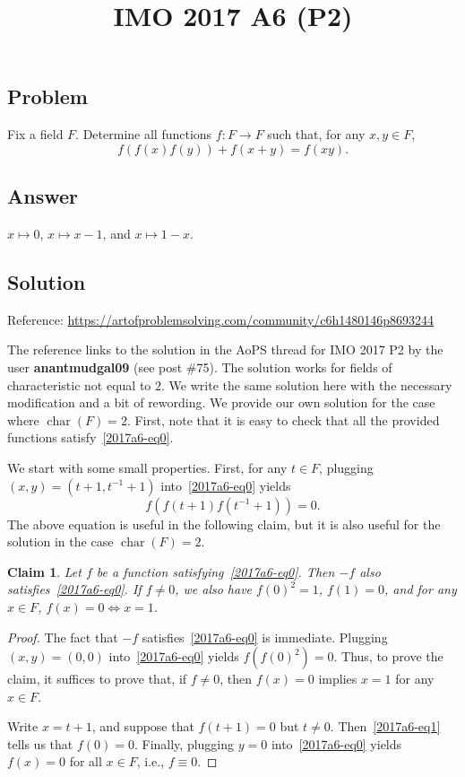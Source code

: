 \documentclass{article}
\title{IMO 2017 A6 (P2)}
\author{}
\date{}
\DeclareMathOperator{\rchar}{char}
\newtheorem*{claim}{Claim}
\begin{document}
\maketitle



\subsection*{Problem}

Fix a field $F$.
Determine all functions $f : F \to F$ such that, for any $x, y \in F$,
\[ f(f(x) f(y)) + f(x + y) = f(xy). \tag{*}\label{2017a6-eq0} \]



\subsection*{Answer}

$x \mapsto 0$, $x \mapsto x - 1$, and $x \mapsto 1 - x$.



\subsection*{Solution}

Reference: \url{https://artofproblemsolving.com/community/c6h1480146p8693244}

The reference links to the solution in the AoPS thread for IMO 2017 P2 by the user \textbf{anantmudgal09} (see post \#75).
The solution works for fields of characteristic not equal to $2$.
We write the same solution here with the necessary modification and a bit of rewording.
We provide our own solution for the case where $\rchar(F) = 2$.
First, note that it is easy to check that all the provided functions satisfy~\eqref{2017a6-eq0}.

We start with some small properties.
First, for any $t \in F$, plugging $(x, y) = (t + 1, t^{-1} + 1)$ into~\eqref{2017a6-eq0} yields
\[ f(f(t + 1) f(t^{-1} + 1)) = 0. \tag{1}\label{2017a6-eq1} \]
The above equation is useful in the following claim, but it is also useful for the solution in the case $\rchar(F) = 2$.

\begin{claim}
Let $f$ be a function satisfying~\eqref{2017a6-eq0}.
Then $-f$ also satisfies~\eqref{2017a6-eq0}.
If $f \neq 0$, we also have $f(0)^2 = 1$, $f(1) = 0$, and for any $x \in F$, $f(x) = 0 \iff x = 1$.
\end{claim}
\begin{proof}
The fact that $-f$ satisfies~\eqref{2017a6-eq0} is immediate.
Plugging $(x, y) = (0, 0)$ into~\eqref{2017a6-eq0} yields $f(f(0)^2) = 0$.
Thus, to prove the claim, it suffices to prove that, if $f \neq 0$, then $f(x) = 0$ implies $x = 1$ for any $x \in F$.

Write $x = t + 1$, and suppose that $f(t + 1) = 0$ but $t \neq 0$.
Then~\eqref{2017a6-eq1} tells us that $f(0) = 0$.
Finally, plugging $y = 0$ into~\eqref{2017a6-eq0} yields $f(x) = 0$ for all $x \in F$, i.e., $f \equiv 0$.
\end{proof}
\end{document}
